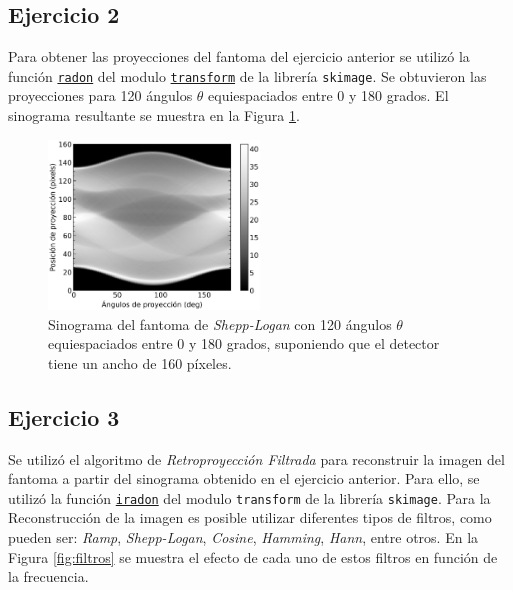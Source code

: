 \documentclass[11pt, twocolumn]{article}
\begin{document}
\subsection*{Ejercicio 2}
Para obtener las proyecciones del fantoma del ejercicio anterior se utilizó la función \href{https://scikit-image.org/docs/stable/api/skimage.transform.html#skimage.transform.radon}{\texttt{radon}} del modulo \href{https://scikit-image.org/docs/stable/api/skimage.transform.html#}{\texttt{transform}} de la librería \texttt{skimage}. Se obtuvieron las proyecciones para 120 ángulos $\theta$ equiespaciados entre 0 y 180 grados. El sinograma resultante se muestra en la Figura \ref{fig:sinograma_ej_2}.

\begin{figure} [htbp]
    \centering
    \includegraphics[width=0.5\textwidth]{images/ej_2/sinogram.png}
    \caption{Sinograma del fantoma de \textit{Shepp-Logan} con 120 ángulos $\theta$ equiespaciados entre 0 y 180 grados, suponiendo que el detector tiene un ancho de 160 píxeles.}
    \label{fig:sinograma_ej_2}
\end{figure}

\subsection*{Ejercicio 3}
Se utilizó el algoritmo de \textit{Retroproyección Filtrada} para reconstruir la imagen del fantoma a partir del sinograma obtenido en el ejercicio anterior. Para ello, se utilizó la función \href{https://scikit-image.org/docs/stable/api/skimage.transform.html#skimage.transform.iradon}{\texttt{iradon}} del modulo \texttt{transform} de la librería \texttt{skimage}. Para la Reconstrucción de la imagen es posible utilizar diferentes tipos de filtros, como pueden ser: \textit{Ramp}, \textit{Shepp-Logan}, \textit{Cosine}, \textit{Hamming}, \textit{Hann}, entre otros. En la Figura \ref{fig:filtros} se muestra el efecto de cada uno de estos filtros en función de la frecuencia.
\end{document}
